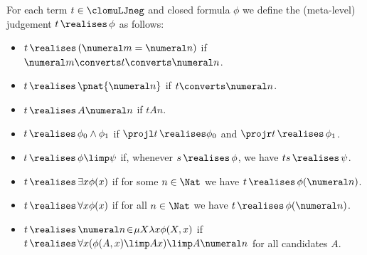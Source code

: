 \begin{definition}
    For each term $t\in \clomuLJneg$ and closed formula $\phi$ we define the (meta-level) judgement $t \, \realises\, \phi$ as follows:
\begin{itemize}
    \item $t\, \realises \, (\numeral m = \numeral n)$ if $\numeral m \converts t \converts \numeral n$.
    \item $t \, \realises \, \pnat {\numeral n}$ if $t\converts \numeral n$.
     \item $t\, \realises\, A\numeral n$ if $t A n$.
    \item $t\, \realises\, \phi_0 \land \phi_1$ if $\projl t \, \realises \phi_0$ and $\projr t \, \realises\, \phi_1$.
    \item $t \, \realises\,  \phi \limp \psi $ if, whenever $s\, \realises \, \phi$, we have $ts \, \realises\, \psi$.
    \item $t\, \realises\, \exists x \phi(x)$ if for some $n\in \Nat$ we have $t\, \realises \, \phi(\numeral n)$.
    \item $t\, \realises\,  \forall x \phi(x)$ if for all $n \in \Nat $ we have $t\, \realises\, \phi(\numeral n)$.
    \item $t\, \realises\, \numeral n \hspace{-.15em}\in \hspace{-.2em} \mu X \lambda x \phi(X,x)$ if $t\, \realises \, \forall x (\phi(A,x)\limp Ax) \limp A\numeral n$ for all candidates $A$.
\end{itemize}
\end{definition}


    


